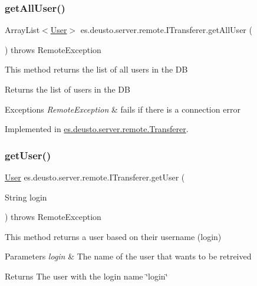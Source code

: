 \subsubsection{\texorpdfstring{get\+All\+User()}{getAllUser()}}
{\footnotesize\ttfamily Array\+List$<$\hyperlink{classes_1_1deusto_1_1server_1_1db_1_1data_1_1_user}{User}$>$ es.\+deusto.\+server.\+remote.\+I\+Transferer.\+get\+All\+User (\begin{DoxyParamCaption}{ }\end{DoxyParamCaption}) throws Remote\+Exception}

This method returns the list of all users in the DB \begin{DoxyReturn}{Returns}
the list of users in the DB 
\end{DoxyReturn}

\begin{DoxyExceptions}{Exceptions}
{\em Remote\+Exception} & fails if there is a connection error \\
\hline
\end{DoxyExceptions}


Implemented in \hyperlink{classes_1_1deusto_1_1server_1_1remote_1_1_transferer_a613c0c3af149140e58488ce9d0745593}{es.\+deusto.\+server.\+remote.\+Transferer}.

\mbox{\label{interfacees_1_1deusto_1_1server_1_1remote_1_1_i_transferer_ab767521556fc61bc5a39306080f00cae}} 
\subsubsection{\texorpdfstring{get\+User()}{getUser()}}
{\footnotesize\ttfamily \hyperlink{classes_1_1deusto_1_1server_1_1db_1_1data_1_1_user}{User} es.\+deusto.\+server.\+remote.\+I\+Transferer.\+get\+User (\begin{DoxyParamCaption}\item[{String}]{login }\end{DoxyParamCaption}) throws Remote\+Exception}

This method returns a user based on their username (login) 
\begin{DoxyParams}{Parameters}
{\em login} & The name of the user that wants to be retreived \\
\hline
\end{DoxyParams}
\begin{DoxyReturn}{Returns}
The user with the login name \char`\"{}login\char`\"{} 
\end{DoxyReturn}

